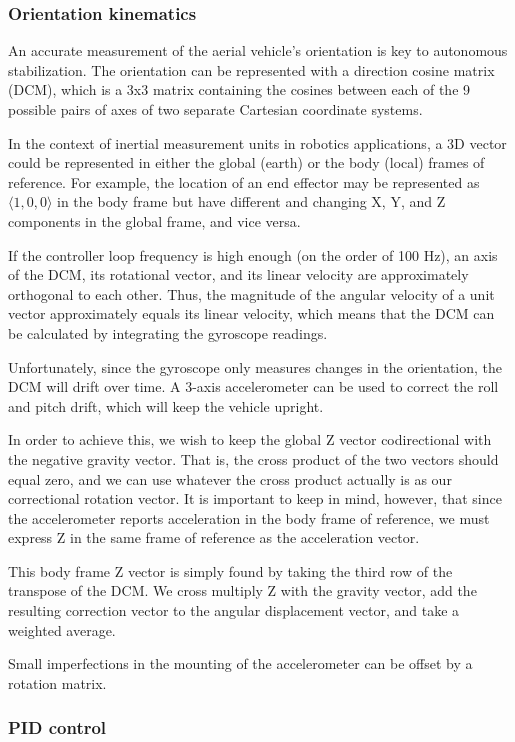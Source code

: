 \documentclass[12pt,letterpaper]{article}
\begin{document}
\subsubsection*{Orientation kinematics}

An accurate measurement of the aerial vehicle's orientation is key to
autonomous stabilization. The orientation can be represented with a direction
cosine matrix (DCM), which is a 3x3 matrix containing the cosines between each
of the 9 possible pairs of axes of two separate Cartesian coordinate systems.

In the context of inertial measurement units in robotics applications, a 3D
vector could be represented in either the global (earth) or the body (local)
frames of reference. For example, the location of an end effector may be
represented as $\langle1, 0, 0\rangle$ in the body frame but have different and changing
X, Y, and Z components in the global frame, and vice versa.

If the controller loop frequency is high enough (on the order of 100 Hz), an
axis of the DCM, its rotational vector, and its linear velocity are
approximately orthogonal to each other. Thus, the magnitude of the angular
velocity of a unit vector approximately equals its linear velocity, which means
that the DCM can be calculated by integrating the gyroscope readings.

Unfortunately, since the gyroscope only measures changes in the orientation,
the DCM will drift over time. A 3-axis accelerometer can be used to correct the
roll and pitch drift, which will keep the vehicle upright.

In order to achieve this, we wish to keep the global Z vector codirectional
with the negative gravity vector. That is, the cross product of the two vectors
should equal zero, and we can use whatever the cross product actually is as our
correctional rotation vector. It is important to keep in mind, however, that
since the accelerometer reports acceleration in the body frame of reference, we
must express Z in the same frame of reference as the acceleration vector.

This body frame Z vector is simply found by taking the third row of the
transpose of the DCM. We cross multiply Z with the gravity vector, add the
resulting correction vector to the angular displacement vector, and take a
weighted average.

Small imperfections in the mounting of the accelerometer can be offset by a
rotation matrix.


\subsubsection*{PID control}
\end{document}
